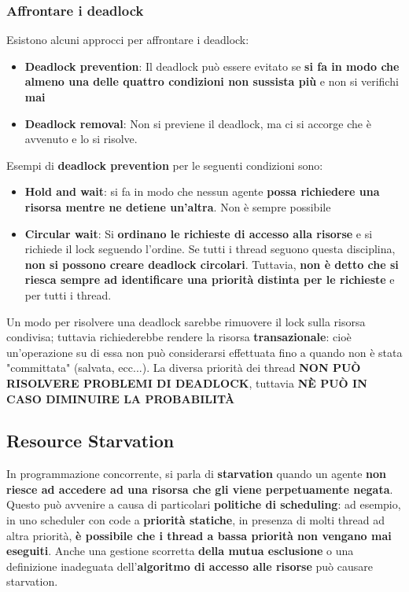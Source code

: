 \documentclass[12pt]{article}
\begin{document}
\subsubsection{Affrontare i deadlock}
Esistono alcuni approcci per affrontare i deadlock:
\begin{itemize}
    \item \textbf{Deadlock prevention}: Il deadlock può essere evitato se \textbf{si fa in modo che almeno una delle quattro condizioni non sussista più} e non si verifichi \textbf{mai}
    \item \textbf{Deadlock removal}: Non si previene il deadlock, ma ci si accorge che è avvenuto e lo si risolve.
\end{itemize}
Esempi di \textbf{deadlock prevention} per le seguenti condizioni sono:
\begin{itemize}
    \item \textbf{Hold and wait}: si fa in modo che nessun agente \textbf{possa richiedere una risorsa mentre ne detiene un'altra}. Non è sempre possibile
    \item \textbf{Circular wait}: Si \textbf{ordinano le richieste di accesso alla risorse} e si richiede il lock seguendo l'ordine. Se tutti i thread seguono questa disciplina, \textbf{non si possono creare deadlock circolari}. Tuttavia, \textbf{non è detto che si riesca sempre ad identificare una priorità distinta per le richieste} e per tutti i thread.
\end{itemize}
Un modo per risolvere una deadlock sarebbe rimuovere il lock sulla risorsa condivisa; tuttavia  richiederebbe rendere la risorsa \textbf{transazionale}: cioè un'operazione su di essa non può considerarsi effettuata fino a quando non è stata "committata" (salvata, ecc...). La diversa priorità dei thread \textbf{NON PUÒ RISOLVERE PROBLEMI DI DEADLOCK}, tuttavia \textbf{NÈ PUÒ IN CASO DIMINUIRE LA PROBABILITÀ}
\subsection{Resource Starvation}
In programmazione concorrente, si parla di \textbf{starvation} quando un agente \textbf{non riesce ad accedere ad una risorsa che gli viene perpetuamente negata}. Questo può avvenire a causa di particolari \textbf{politiche di scheduling}: ad esempio, in uno scheduler con code a \textbf{priorità statiche}, in presenza di molti thread ad altra priorità, \textbf{è possibile che i thread a bassa priorità non vengano mai eseguiti}. Anche una gestione scorretta \textbf{della mutua esclusione} o una definizione inadeguata dell'\textbf{algoritmo di accesso alle risorse} può causare starvation.
\end{document}
